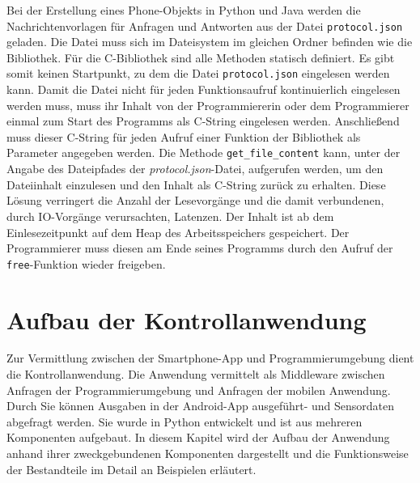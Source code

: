 \documentclass[11pt,a4paper]{report}
\begin{document}
Bei der Erstellung eines Phone-Objekts in Python und Java werden die Nachrichtenvorlagen für Anfragen und Antworten aus der Datei \texttt{protocol.json} geladen.
Die Datei muss sich im Dateisystem im gleichen Ordner befinden wie die Bibliothek.
Für die C-Bibliothek sind alle Methoden statisch definiert.
Es gibt somit keinen Startpunkt, zu dem die Datei \texttt{protocol.json} eingelesen werden kann.
Damit die Datei nicht für jeden Funktionsaufruf kontinuierlich eingelesen werden muss, muss ihr Inhalt von der Programmiererin oder dem Programmierer einmal zum Start des Programms als C-String eingelesen werden.
Anschließend muss dieser C-String für jeden Aufruf einer Funktion der Bibliothek als Parameter angegeben werden.
Die Methode \texttt{get\_file\_content} kann, unter der Angabe des Dateipfades der \textit{protocol.json}-Datei, aufgerufen werden, um den Dateiinhalt einzulesen und den Inhalt als C-String zurück zu erhalten.
Diese Lösung verringert die Anzahl der Lesevorgänge und die damit verbundenen, durch IO-Vorgänge verursachten, Latenzen.
Der Inhalt ist ab dem Einlesezeitpunkt auf dem Heap des Arbeitsspeichers gespeichert.
Der Programmierer muss diesen am Ende seines Programms durch den Aufruf der \texttt{free}-Funktion wieder freigeben.

\chapter{Aufbau der Kontrollanwendung}\label{chap:server_software}
Zur Vermittlung zwischen der Smartphone-App und Programmierumgebung dient die Kontrollanwendung.
Die Anwendung vermittelt als Middleware zwischen Anfragen der Programmierumgebung und Anfragen der mobilen Anwendung.
Durch Sie können Ausgaben in der Android-App ausgeführt- und Sensordaten abgefragt werden.
Sie wurde in Python entwickelt und ist aus mehreren Komponenten aufgebaut.
In diesem Kapitel wird der Aufbau der Anwendung anhand ihrer zweckgebundenen Komponenten dargestellt und die Funktionsweise der Bestandteile im Detail an Beispielen erläutert.
\end{document}
